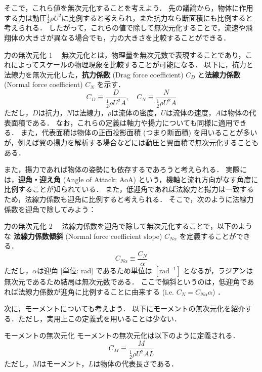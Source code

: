 \documentclass[uplatex,dvipdfmx,a4j,11pt]{jsreport}
\newcommand{\keyword}[1]{\textcolor{mainblue}{\textbf{#1}}}
\numberwithin{equation}{chapter}
\begin{document}
そこで，これら値を無次元化することを考えよう．
先の議論から，物体に作用する力は動圧$\frac{1}{2}\rho U^{2}$に比例すると考えられ，また抗力なら断面積にも比例すると考えられる．
したがって，これらの値で除して無次元化することで，流速や飛翔体の大きさが異なる場合でも，力の大きさを比較することができる．
\begin{definition}{力の無次元化 1}{}{}
  　無次元化とは，物理量を無次元数で表現することであり，これによってスケールの物理現象を比較することが可能になる．
  以下に，抗力と法線力を無次元化した，\keyword{抗力係数} (Drag force coefficient) $C_{D}$ と\keyword{法線力係数} (Normal force coefficient) $C_{N}$ を示す．
    \begin{equation}
      C_{D} \equiv \frac{D}{\frac{1}{2}\rho U^{2}A}, \quad C_{N} \equiv \frac{N}{\frac{1}{2}\rho U^{2}A}
    \end{equation}
  ただし，$D$は抗力，$N$は法線力，$\rho$は流体の密度，$U$は流体の速度，$A$は物体の代表面積である．
  なお，これらの定義は軸力や揚力についても同様に適用できる．
  また，代表面積は物体の正面投影面積 (つまり断面積) を用いることが多いが，例えば翼の揚力を解析する場合などには動圧と翼面積で無次元化することもある．
\end{definition}

また，揚力であれば物体の姿勢にも依存するであろうと考えられる．
実際には，\keyword{迎角・迎え角} (Angle of Attack; AoA) という，機軸と流れ方向がなす角度に比例することが知られている．
また，低迎角であれば法線力と揚力は一致するため，法線力係数も迎角に比例すると考えられる．
そこで，次のように法線力係数を迎角で除してみよう：
\begin{definition}{力の無次元化 2}{}{}
  　法線力係数を迎角で除して無次元化することで，以下のような \keyword{法線力係数傾斜} (Normal force coefficient slope) $C_{N\alpha}$ を定義することができる．
    \begin{equation}
      C_{N\alpha} \equiv \frac{C_{N}}{\alpha}
    \end{equation}
  ただし，$\alpha$は迎角 [単位: rad] であるため単位は $[\mathrm{rad}^{-1}]$ となるが，ラジアンは無次元であるため結局は無次元数である．
  ここで傾斜というのは，低迎角であれば法線力係数が迎角に比例することに由来する (i.e. $C_N = C_{N\alpha} \alpha$) ．
\end{definition}

\enskip

次に，モーメントについても考えよう．
以下にモーメントの無次元化を紹介する．ただし，実用上この定義式を用いることは少ない．
\begin{definition}{モーメントの無次元化}{}{}
  モーメントの無次元化は以下のように定義される．
    \begin{equation}
      C_M \equiv \frac{M}{\frac{1}{2}\rho U^{2}A L}
    \end{equation}
  ただし，$M$はモーメント，$L$は物体の代表長さである．
\end{definition}
\end{document}
